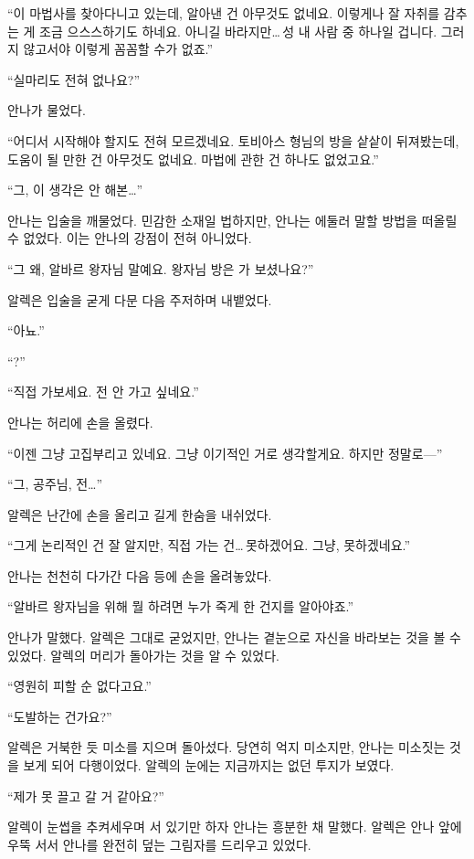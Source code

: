 ``이 마법사를 찾아다니고 있는데, 알아낸 건 아무것도 없네요. 이렇게나 잘 자취를 감추는 게 조금 으스스하기도 하네요. 아니길 바라지만\ldots\,성 내 사람 중 하나일 겁니다. 그러지 않고서야 이렇게 꼼꼼할 수가 없죠.''

``실마리도 전혀 없나요?''

안나가 물었다.

``어디서 시작해야 할지도 전혀 모르겠네요. 토비아스 형님의 방을 샅샅이 뒤져봤는데, 도움이 될 만한 건 아무것도 없네요. 마법에 관한 건 하나도 없었고요.''

``그, 이 생각은 안 해본\ldots''

안나는 입술을 깨물었다. 민감한 소재일 법하지만, 안나는 에둘러 말할 방법을 떠올릴 수 없었다. 이는 안나의 강점이 전혀 아니었다.

``그 왜, 알바르 왕자님 말예요. 왕자님 방은 가 보셨나요?''

알렉은 입술을 굳게 다문 다음 주저하며 내뱉었다.

``아뇨.''

``?''

``직접 가보세요. 전 안 가고 싶네요.''

안나는 허리에 손을 올렸다.

``이젠 그냥 고집부리고 있네요. 그냥 이기적인 거로 생각할게요. 하지만 정말로—''

``그, 공주님, 전\ldots''

알렉은 난간에 손을 올리고 길게 한숨을 내쉬었다.

``그게 논리적인 건 잘 알지만, 직접 가는 건\ldots\,못하겠어요. 그냥, 못하겠네요.''

안나는 천천히 다가간 다음 등에 손을 올려놓았다.

``알바르 왕자님을 위해 뭘 하려면 누가 죽게 한 건지를 알아야죠.''

안나가 말했다. 알렉은 그대로 굳었지만, 안나는 곁눈으로 자신을 바라보는 것을 볼 수 있었다. 알렉의 머리가 돌아가는 것을 알 수 있었다.

``영원히 피할 순 없다고요.''

`` 도발하는 건가요?''

알렉은 거북한 듯 미소를 지으며 돌아섰다. 당연히 억지 미소지만, 안나는 미소짓는 것을 보게 되어 다행이었다. 알렉의 눈에는 지금까지는 없던 투지가 보였다.

``제가 못 끌고 갈 거 같아요?''

알렉이 눈썹을 추켜세우며 서 있기만 하자 안나는 흥분한 채 말했다. 알렉은 안나 앞에 우뚝 서서 안나를 완전히 덮는 그림자를 드리우고 있었다.

